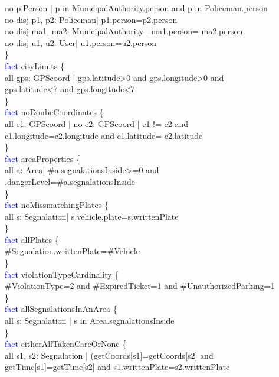 no p:Person | p in MunicipalAuthority.person and p in Policeman.person\\
no disj p1, p2: Policeman| p1.person=p2.person\\
no disj ma1, ma2: MunicipalAuthority | ma1.person= ma2.person\\
no disj u1, u2: User| u1.person=u2.person\\
\}\\
\textcolor{blue}{fact}
\textcolor{mycolor}{cityLimits} \{\\
all gps: GPScoord | gps.latitude>0 and gps.longitude>0 and\\
gps.latitude<7 and gps.longitude<7\\
\}\\
\textcolor{blue}{fact}
\textcolor{mycolor}{noDoubeCoordinates} \{\\
all c1: GPScoord | no c2: GPScoord | c1 != c2 and\\ c1.longitude=c2.longitude and c1.latitude= c2.latitude\\
\}\\
\textcolor{blue}{fact}
\textcolor{mycolor}{areaProperties} \{\\
all a: Area| \#a.segnalationsInside>=0 and\\ \a.dangerLevel=\#a.segnalationsInside\\
\}\\
\textcolor{blue}{fact}
\textcolor{mycolor}{noMissmatchingPlates} \{\\
all s: Segnalation| s.vehicle.plate=s.writtenPlate\\
\}\\
\textcolor{blue}{fact}
\textcolor{mycolor}{allPlates} \{\\
\#Segnalation.writtenPlate=\#Vehicle\\
\}\\
\textcolor{blue}{fact}
\textcolor{mycolor}{violationTypeCardinality} \{\\
\#ViolationType=2 and \#ExpiredTicket=1 and \#UnauthorizedParking=1\\
\}\\
\textcolor{blue}{fact}
\textcolor{mycolor}{allSegnalationsInAnArea} \{\\
all s: Segnalation | s in Area.segnalationsInside\\
\}\\
\textcolor{blue}{fact}
\textcolor{mycolor}{eitherAllTakenCareOrNone} \{\\
all s1, s2: Segnalation | (getCoords[s1]=getCoords[s2] and\\ getTime[s1]=getTime[s2] and s1.writtenPlate=s2.writtenPlate \\
